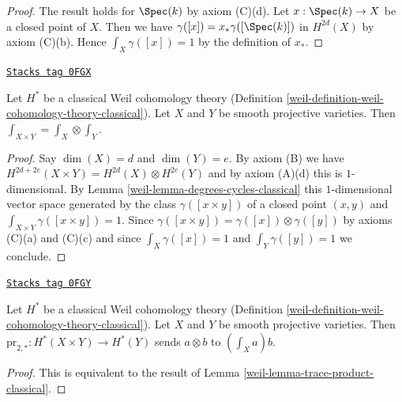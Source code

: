\begin{proof}
The result holds for $\Spec(k)$ by axiom (C)(d). Let $x : \Spec(k) \to X$
be a closed point of $X$. Then we have $\gamma([x]) = x_*\gamma([\Spec(k)])$
in $H^{2d}(X)$ by axiom (C)(b). Hence $\int_X \gamma([x]) = 1$ by the
definition of $x_*$.
\end{proof}

\begin{lemma}
\label{weil-lemma-trace-product-classical}
\href{https://stacks.math.columbia.edu/tag/0FGX}{\texttt{Stacks tag 0FGX}}

Let $H^*$ be a classical Weil cohomology theory
(Definition \ref{weil-definition-weil-cohomology-theory-classical}).
Let $X$ and $Y$ be smooth projective varieties.
Then $\int_{X \times Y} = \int_X \otimes \int_Y$.
\end{lemma}

\begin{proof}

Say $\dim(X) = d$ and $\dim(Y) = e$. By axiom (B) we have
$H^{2d + 2e}(X \times Y) = H^{2d}(X) \otimes H^{2e}(Y)$
and by axiom (A)(d) this is $1$-dimensional.
By Lemma \ref{weil-lemma-degrees-cycles-classical}
this $1$-dimensional vector space generated by the
class $\gamma([x \times y])$ of a closed point $(x, y)$ and
$\int_{X \times Y} \gamma([x \times y]) = 1$.
Since $\gamma([x \times y]) = \gamma([x]) \otimes \gamma([y])$
by axioms (C)(a) and (C)(c) and since $\int_X \gamma([x]) = 1$ and
$\int_Y \gamma([y]) = 1$ we conclude.
\end{proof}

\begin{lemma}
\label{weil-lemma-pr2star-classical}
\href{https://stacks.math.columbia.edu/tag/0FGY}{\texttt{Stacks tag 0FGY}}

Let $H^*$ be a classical Weil cohomology theory
(Definition \ref{weil-definition-weil-cohomology-theory-classical}).
Let $X$ and $Y$ be smooth projective varieties.
Then $\text{pr}_{2, *} : H^*(X \times Y) \to H^*(Y)$
sends $a \otimes b$ to $(\int_X a) b$.
\end{lemma}

\begin{proof}

This is equivalent to the result of Lemma \ref{weil-lemma-trace-product-classical}.
\end{proof}


